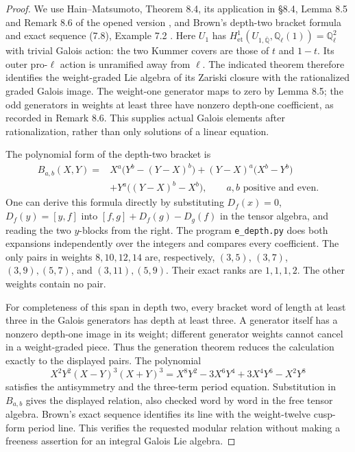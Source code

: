 \begin{proof}
We use Hain--Matsumoto, Theorem 8.4, its application in \S8.4,
Lemma 8.5 and Remark 8.6 of the opened version
\cite{E_HainMatsumoto}, and Brown's depth-two bracket formula and
exact sequence (7.8), Example 7.2 \cite{E_BrownDepth}.
Here $U_1$ has $H^1_{\mathrm{et}}(U_{1,\overline{\mathbb Q}},
\mathbb Q_\ell(1))=\mathbb Q_\ell^2$ with trivial Galois action:
the two Kummer covers are those of $t$ and $1-t$.
Its outer pro-$\ell$ action is unramified away from $\ell$.
The indicated theorem therefore identifies the weight-graded Lie
algebra of its Zariski closure with the rationalized graded Galois
image. The weight-one generator maps to zero by Lemma 8.5;
the odd generators in weights at least three have nonzero
depth-one coefficient, as recorded in Remark 8.6. This supplies
actual Galois elements after rationalization, rather than only
solutions of a linear equation.

The polynomial form of the depth-two bracket is
\begin{align*}
 B_{a,b}(X,Y)={}&X^a\bigl(Y^b-(Y-X)^b\bigr)
 +(Y-X)^a\bigl(X^b-Y^b\bigr)\\
 &+Y^a\bigl((Y-X)^b-X^b\bigr),
 \qquad a,b\text{ positive and even}.
\end{align*}
One can derive this formula directly by substituting
$D_f(x)=0$, $D_f(y)=[y,f]$ into
$[f,g]+D_f(g)-D_g(f)$ in the tensor algebra, and reading the
two $y$-blocks from the right. The program \texttt{e\_depth.py}
does both expansions independently over the integers and compares
every coefficient. The only pairs in weights $8,10,12,14$ are,
respectively, $(3,5)$, $(3,7)$, $(3,9),(5,7)$, and
$(3,11),(5,9)$. Their exact ranks are $1,1,1,2$.
The other weights contain no pair.

For completeness of this span in depth two, every bracket word of
length at least three in the Galois generators has depth at least
three. A generator itself has a nonzero depth-one image in its
weight; different generator weights cannot cancel in a weight-graded
piece. Thus the generation theorem reduces the calculation exactly
to the displayed pairs. The polynomial
\[
 X^2Y^2(X-Y)^3(X+Y)^3
 =X^8Y^2-3X^6Y^4+3X^4Y^6-X^2Y^8
\]
satisfies the antisymmetry and the three-term period equation.
Substitution in $B_{a,b}$ gives the displayed relation, also checked
word by word in the free tensor algebra. Brown's exact sequence
identifies its line with the weight-twelve cusp-form period line.
This verifies the requested modular relation without making a
freeness assertion for an integral Galois Lie algebra.
\end{proof}

